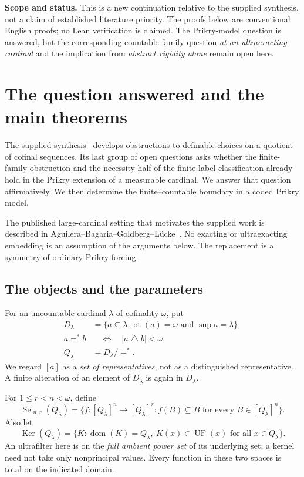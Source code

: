 \documentclass[11pt,letterpaper]{article}
\theoremstyle{definition}
\numberwithin{equation}{section}
\newcommand{\UF}{\operatorname{UF}}
\newcommand{\Sel}{\operatorname{Sel}}
\newcommand{\Ker}{\operatorname{Ker}}
\newcommand{\ot}{\operatorname{ot}}
\newcommand{\symdiff}{\mathbin{\triangle}}
\begin{document}
\textbf{Scope and status.} This is a new continuation relative to the supplied synthesis, not a claim of established literature priority. The proofs below are conventional English proofs; no Lean verification is claimed. The Prikry-model question is answered, but the corresponding countable-family question \emph{at an ultraexacting cardinal} and the implication from \emph{abstract rigidity alone} remain open here.

\newpage
\tableofcontents
\newpage

\section{The question answered and the main theorems}\label{sec:main}

The supplied synthesis~\cite{synthesis} develops obstructions to definable choices on a quotient of cofinal sequences. Its last group of open questions asks whether the finite-family obstruction and the necessity half of the finite-label classification already hold in the Prikry extension of a measurable cardinal. We answer that question affirmatively. We then determine the finite--countable boundary in a coded Prikry model.

The published large-cardinal setting that motivates the supplied work is described in Aguilera--Bagaria--Goldberg--L\"ucke~\cite{abgl}. No exacting or ultraexacting embedding is an assumption of the arguments below. The replacement is a symmetry of ordinary Prikry forcing.

\subsection{The objects and the parameters}

For an uncountable cardinal $\lambda$ of cofinality $\omega$, put
\begin{align}
D_\lambda&=\{a\subseteq\lambda:\ot(a)=\omega\text{ and }\sup a=\lambda\},\\
a=^*b&\quad\Longleftrightarrow\quad |a\symdiff b|<\omega,\\
Q_\lambda&=D_\lambda/{=^*}.
\end{align}
We regard $[a]$ as a \emph{set of representatives}, not as a distinguished representative. A finite alteration of an element of $D_\lambda$ is again in $D_\lambda$.

For $1\le r<n<\omega$, define
\[
\Sel_{n,r}(Q_\lambda)=
\{f:[Q_\lambda]^n\longrightarrow[Q_\lambda]^r:
                     f(B)\subseteq B\text{ for every }B\in[Q_\lambda]^n\}.
\]
Also let
\[
\Ker(Q_\lambda)=
\{K:\operatorname{dom}(K)=Q_\lambda,
             \ K(x)\in\UF(x)\text{ for all }x\in Q_\lambda\}.
\]
An ultrafilter here is on the \emph{full ambient power set} of its underlying set; a kernel need not take only nonprincipal values. Every function in these two spaces is total on the indicated domain.
\end{document}
